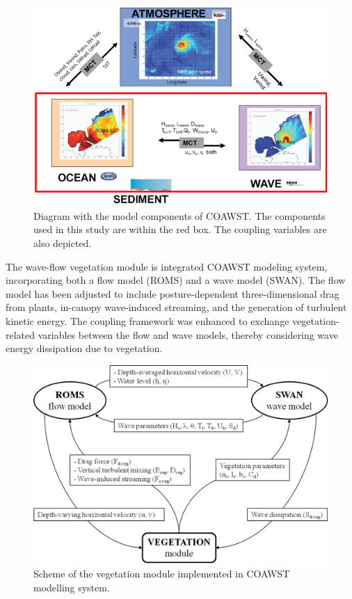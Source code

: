 \documentclass[12pt]{article}
\begin{document}
\begin{figure}[h]
    \centering
    \includegraphics[scale=0.7]{plots/coawst_structure.PNG}
    \caption{Diagram with the model components of COAWST. The components used in this study are within the red box. The coupling variables are also depicted.}
    \label{fig:coawst_structure}
\end{figure}

The wave-flow vegetation module is integrated COAWST modeling system, incorporating both a flow model (ROMS) and a wave model (SWAN). The flow model has been adjusted to include posture-dependent three-dimensional drag from plants, in-canopy wave-induced streaming, and the generation of turbulent kinetic energy. The coupling framework was enhanced to exchange vegetation-related variables between the flow and wave models, thereby considering wave energy dissipation due to vegetation.

\begin{figure}[h]
    \centering
    \includegraphics[scale=1.1]{plots/scheme_vegetation_module.jpg}
    \caption{Scheme of the vegetation module implemented in COAWST modelling system.}
    \label{fig:scheme_vegetation_module}
\end{figure}
\end{document}
